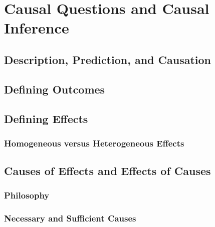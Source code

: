 \documentclass[12pt]{article}
\begin{document}


\section{Causal Questions and Causal Inference}



\subsection{Description, Prediction, and Causation}

\subsection{Defining Outcomes}

\subsection{Defining Effects}

\subsubsection{Homogeneous versus Heterogeneous Effects}

\subsection{Causes of Effects and Effects of Causes}
\subsubsection{Philosophy}

\subsubsection{Necessary and Sufficient Causes}
\end{document}
